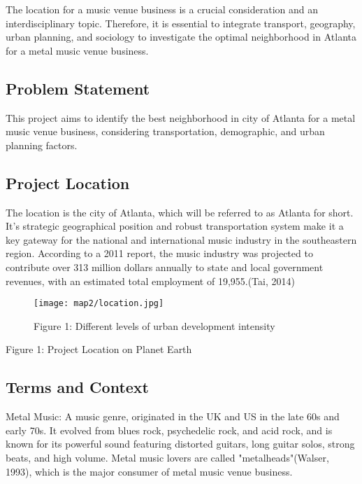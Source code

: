 \documentclass[11pt]{article}
\begin{document}
The location for a music venue business is a crucial consideration and an interdisciplinary topic. Therefore, it is essential to integrate transport, geography, urban planning, and sociology to investigate the optimal neighborhood in Atlanta for a metal music venue business. 

\subsection{Problem Statement}
This project aims to identify the best neighborhood in city of Atlanta for a metal music venue business, considering transportation, demographic, and urban planning factors.

\subsection{Project Location}
The location is the city of Atlanta, which will be referred to as Atlanta for short. It's strategic geographical position and robust transportation system make it a key gateway for the national and international music industry in the southeastern region. According to a 2011 report, the music industry was projected to contribute over 313 million dollars annually to state and local government revenues, with an estimated total employment of 19,955.(Tai, 2014)

\begin{figure}[H]
\begin{center}
\centering
\texttt{[image: map2/location.jpg]}
\caption{Figure 1: Different levels of urban development intensity}
\label{fig:figure1}
\end{center}
\end{figure}

\begin{center}
\centering
Figure 1: Project Location on Planet Earth
\end{center}


\subsection{Terms and Context}
Metal Music: A music genre, originated in the UK and US in the late 60s and early 70s. It evolved from blues rock, psychedelic rock, and acid rock, and is known for its powerful sound featuring distorted guitars, long guitar solos, strong beats, and high volume. Metal music lovers are called "metalheads"(Walser, 1993), which is the major consumer of metal music venue business.
\end{document}
